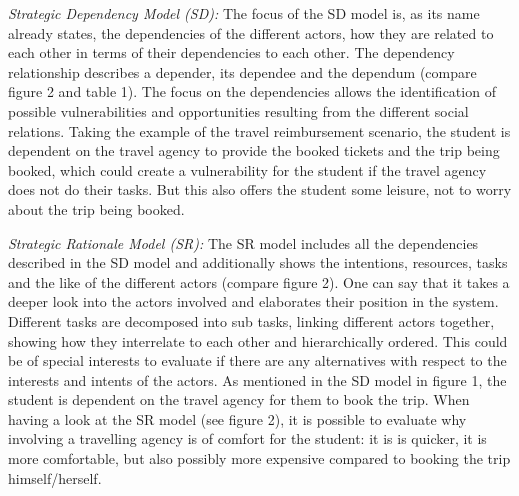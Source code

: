 \documentclass[11pt,a4paper]{article}
\begin{document}
\textit{Strategic Dependency Model (SD):} The focus of the SD model is, as its
name already states, the dependencies of the different actors, how they are
related to each other in terms of their dependencies to each other. The
dependency relationship describes a depender, its dependee and the dependum
(compare figure 2 and table 1). The focus on the dependencies allows the
identification of possible vulnerabilities and opportunities resulting from
the different social relations. Taking the example of the travel reimbursement
scenario, the student is dependent on the travel agency to provide the booked
tickets and the trip being booked, which could create a vulnerability for the
student if the travel agency does not do their tasks. But this also offers the
student some leisure, not to worry about the trip being booked.

\textit{Strategic Rationale Model (SR):} The SR model includes all the
dependencies described in the SD model and additionally shows the intentions,
resources, tasks and the like of the different actors (compare figure 2). One
can say that it takes a deeper look into the actors involved and elaborates
their position in the system. Different tasks are decomposed into sub tasks,
linking different actors together, showing how they interrelate to each other
and hierarchically ordered. This could be of special interests to evaluate if
there are any alternatives with respect to the interests and intents of the
actors. As mentioned in the SD model in figure 1, the student is dependent on
the travel agency for them to book the trip. When having a look at the SR
model (see figure 2), it is possible to evaluate why involving a travelling
agency is of comfort for the student: it is is quicker, it is more
comfortable, but also possibly more expensive compared to booking the trip
himself/herself.
\newpage
\end{document}
